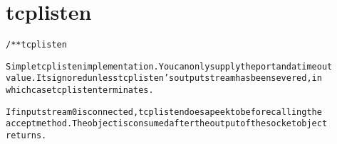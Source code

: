 \section{tcplisten}
\begin{shaded}
\begin{alltt}
/** tcplisten

Simple tcplisten implementation.  You can only supply the port and a timeout
value.  Its ignored unless tcplisten's output stream has been severed, in
which case tcplisten terminates.

If input stream 0 is connected, tcplisten does a peekto before calling the
accept method.  The object is consumed after the output of the socket object
returns.

\end{alltt}
\end{shaded}
